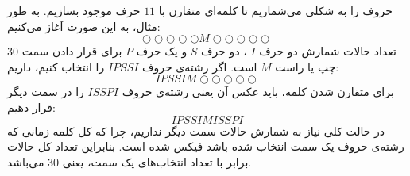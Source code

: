 \p
حروف را به شکلی می‌شماریم تا کلمه‌ای متقارن با
$11$
حرف موجود بسازیم. به طور مثال، به این صورت آغاز می‌کنیم:
$$\bigcirc\bigcirc\bigcirc\bigcirc\bigcirc M\bigcirc\bigcirc\bigcirc\bigcirc\bigcirc$$
$30$
تعداد حالات شمارش دو حرف
$I$
، دو حرف
$S$
و یک حرف
$P$
برای قرار دادن سمت چپ یا راست 
$M$
است. اگر رشته‌ی حروف
$IPSSI$
را انتخاب کنیم، داریم:
$$IPSSIM\bigcirc\bigcirc\bigcirc\bigcirc\bigcirc$$
برای متقارن شدن کلمه، باید عکس آن یعنی رشته‌ی حروف
$ISSPI$
را در سمت دیگر قرار دهیم:
$$IPSSIMISSPI$$
در حالت کلی نیاز به شمارش حالات سمت دیگر نداریم، چرا که کل کلمه زمانی که رشته‌ی حروف یک سمت انتخاب شده باشد فیکس شده است. بنابراین تعداد کل حالات برابر با تعداد انتخاب‌های یک سمت، یعنی
$30$
می‌باشد.
